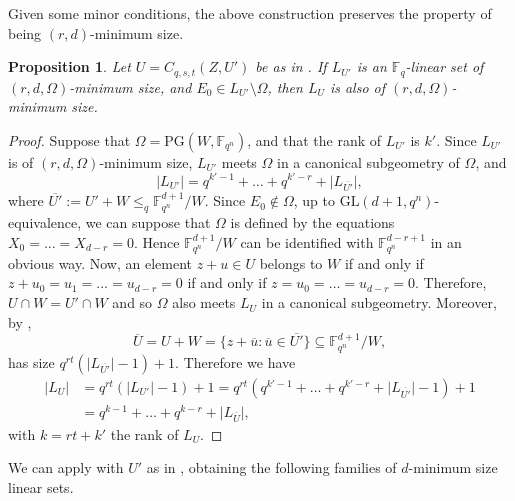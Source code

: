 \documentclass[11pt]{article}
\newtheorem{proposition}[theorem]{Proposition}
\theoremstyle{definition}
\newcommand{\fqn}{\mathbb{F}_{q^n}}
\newcommand{\F}{{\mathbb F}}
\newcommand{\fq}{{\mathbb F}_{q}}
\newcommand{\PG}{\mathrm{PG}}
\begin{document}
Given some minor conditions, the above construction preserves the property of being $(r,d)$-minimum size.

\begin{proposition}
 \label{prop:liftminconse}
Let $U = C_{q,s,t}(Z,U')$ be as in .
If $L_{U'}$ is an $\fq$-linear set of $(r,d,\Omega)$-minimum size, and $E_0 \in L_{U'} \setminus \Omega$, then $L_U$ is also of $(r,d,\Omega)$-minimum size.
\end{proposition}

\begin{proof}
Suppose that $\Omega = \PG(W,\fqn)$, and that the rank of $L_{U'}$ is $k'$.
Since $L_{U'}$ is of $(r,d,\Omega)$-minimum size, $L_{U'}$ meets $\Omega$ in a canonical subgeometry of $\Omega$, and
\[
\lvert L_{U'} \rvert=q^{k'-1}+\ldots+q^{k'-r}+\lvert L_{\overline{U'}} \rvert,
\]
where $\overline{U'}:=U'+W \leq_q \F_{q^n}^{d+1}/W$.
Since $E_0 \notin \Omega$, up to $\mathrm{GL}(d+1,q^n)$-equivalence, we can suppose that $\Omega$ is defined by the equations $X_0=\ldots=X_{d-r}=0$.
Hence $\F_{q^n}^{d+1}/W$ can be identified with $\F_{q^n}^{d-r+1}$ in an obvious way.
Now, an element $z + u \in U$ belongs to $W$ if and only if $z+ u_0 = u_1 = \ldots = u_{d-r}=0$ if and only if $z = u_0 = \ldots = u_{d-r} = 0$.
Therefore, $U \cap W= U' \cap W$ and so $\Omega$ also meets $L_U$ in a canonical subgeometry.
Moreover, by ,
\[
\overline{U}=U+W=\{ z + \overline u \colon \overline u \in \overline{U'}\} \subseteq \F_{q^n}^{d+1}/W,
\]
has size $q^{r t}(\lvert L_{\overline{U'}} \rvert -1)+1$.
Therefore we have 
\begin{align*}
 |L_U| & = q^{r t}(\lvert L_{U'} \rvert -1)+1
 = q^{r t}( q^{k'-1}+ \ldots + q^{k'-r}+ \lvert L_{\overline{U'}} \rvert - 1 ) + 1 \\
 & = q^{k-1}+\ldots+q^{k-r}+ \lvert L_{\overline{U}} \rvert,
\end{align*}
with $k = rt + k'$ the rank of $L_U$.
\end{proof}

We can apply  with $U'$ as in , obtaining the following families of $d$-minimum size linear sets.
\end{document}
